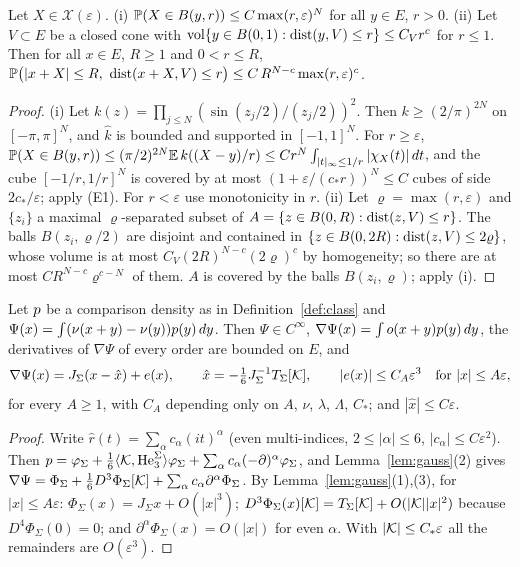 \begin{lemma}\label{lem:ball}
Let $X\in\mathcal X(\varepsilon)$. \textup{(i)} $\mathbb{P}(X\in B(y,r))\le C\max(r,\varepsilon)^N$ for all $y\in E$, $r>0$.
\textup{(ii)} Let $V\subset E$ be a closed cone with $\operatorname{vol}\{y\in B(0,1):\operatorname{dist}(y,V)\le r\}\le C_Vr^c$ for $r\le1$. Then for
all $x\in E$, $R\ge1$ and $0<r\le R$,
$\mathbb{P}\big(|x+X|\le R,\ \operatorname{dist}(x+X,V)\le r\big)\le C\,R^{N-c}\max(r,\varepsilon)^c$.
\end{lemma}
\begin{proof}
(i) Let $k(z)=\prod_{j\le N}(\sin(z_j/2)/(z_j/2))^2$. Then $k\ge(2/\pi)^{2N}$ on $[-\pi,\pi]^N$, and $\widehat k$ is
bounded and supported in $[-1,1]^N$. For $r\ge\varepsilon$,
$\mathbb{P}(X\in B(y,r))\le(\pi/2)^{2N}\mathbb{E}\,k((X-y)/r)\le Cr^N\int_{|t|_\infty\le1/r}|\chi_X(t)|\,dt$, and the cube
$[-1/r,1/r]^N$ is covered by at most $(1+\varepsilon/(c_\ast r))^N\le C$ cubes of side $2c_\ast/\varepsilon$; apply
\textup{(E1)}. For $r<\varepsilon$ use monotonicity in $r$.
(ii) Let $\varrho=\max(r,\varepsilon)$ and $\{z_i\}$ a maximal $\varrho$-separated subset of
$A=\{z\in B(0,R):\operatorname{dist}(z,V)\le r\}$. The balls $B(z_i,\varrho/2)$ are disjoint and contained in
$\{z\in B(0,2R):\operatorname{dist}(z,V)\le2\varrho\}$, whose volume is at most $C_V(2R)^{N-c}(2\varrho)^c$ by homogeneity; so there are
at most $CR^{N-c}\varrho^{c-N}$ of them. $A$ is covered by the balls $B(z_i,\varrho)$; apply (i).
\end{proof}

\begin{lemma}\label{lem:locate}
Let $p$ be a comparison density as in Definition~\ref{def:class} and
$\Psi(x)=\int(\nu(x+y)-\nu(y))p(y)\,dy$. Then $\Psi\in C^\infty$,
$\nabla\Psi(x)=\int o(x+y)p(y)\,dy$, the derivatives of $\nabla\Psi$ of every order are bounded on $E$, and
\[
\nabla\Psi(x)=J_\Sigma(x-\hat x)+e(x),\qquad\hat x=-\tfrac16J_\Sigma^{-1}T_\Sigma[\mathcal{K}],\qquad
|e(x)|\le C_A\varepsilon^3\quad\text{for }|x|\le A\varepsilon,
\]
for every $A\ge1$, with $C_A$ depending only on $A$, $\nu$, $\lambda$, $\Lambda$, $C_\ast$; and $|\hat x|\le C\varepsilon$.
\end{lemma}
\begin{proof}
Write $\widehat r(t)=\sum_\alpha c_\alpha(it)^\alpha$ (even multi-indices, $2\le|\alpha|\le6$, $|c_\alpha|\le C\varepsilon^2$).
Then $p=\varphi_\Sigma+\frac16\langle \mathcal{K}, \mathrm{He}^\Sigma_3\rangle\varphi_\Sigma+\sum_\alpha c_\alpha(-\partial)^\alpha\varphi_\Sigma$, and
Lemma~\ref{lem:gauss}(2) gives
$\nabla\Psi=\Phi_\Sigma+\frac16D^3\Phi_\Sigma[\mathcal{K}]+\sum_\alpha c_\alpha\partial^\alpha\Phi_\Sigma$. By
Lemma~\ref{lem:gauss}(1),(3), for $|x|\le A\varepsilon$: $\Phi_\Sigma(x)=J_\Sigma x+O(|x|^3)$;
$D^3\Phi_\Sigma(x)[\mathcal{K}]=T_\Sigma[\mathcal{K}]+O(|\mathcal{K}||x|^2)$ because $D^4\Phi_\Sigma(0)=0$; and
$\partial^\alpha\Phi_\Sigma(x)=O(|x|)$ for even $\alpha$. With $|\mathcal{K}|\le C_\ast\varepsilon$ all the remainders are $O(\varepsilon^3)$.
\end{proof}

